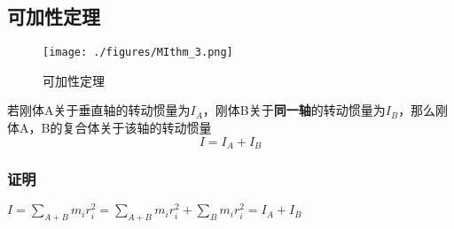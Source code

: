 \subsection{可加性定理}
\begin{figure}[ht]
\centering
\texttt{[image: ./figures/MIthm\_3.png]}
\caption{可加性定理} \label{MIthm_fig3}
\end{figure}
若刚体A关于垂直轴的转动惯量为$I_A$，刚体B关于\textbf{同一轴}的转动惯量为$I_B$，那么刚体A，B的复合体关于该轴的转动惯量
\begin{equation}
I=I_A+I_B
\end{equation}

\subsubsection{证明}
$I=\sum_{A+B} m_i r_i^2=\sum_{A+B} m_i r_i^2 +\sum_B m_i r_i^2 = I_A+I_B$
